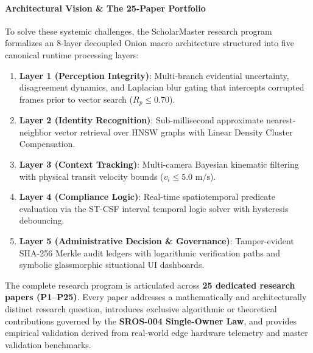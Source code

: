 \documentclass[11pt,letterpaper]{article}
\begin{document}
\paragraph{Architectural Vision \& The 25-Paper Portfolio}
To solve these systemic challenges, the ScholarMaster research program formalizes an 8-layer decoupled Onion macro architecture structured into five canonical runtime processing layers:
\begin{enumerate}[leftmargin=*]
    \item \textbf{Layer 1 (Perception Integrity)}: Multi-branch evidential uncertainty, disagreement dynamics, and Laplacian blur gating that intercepts corrupted frames prior to vector search ($R_p \le 0.70$).
    \item \textbf{Layer 2 (Identity Recognition)}: Sub-millisecond approximate nearest-neighbor vector retrieval over HNSW graphs with Linear Density Cluster Compensation.
    \item \textbf{Layer 3 (Context Tracking)}: Multi-camera Bayesian kinematic filtering with physical transit velocity bounds ($v_i \le 5.0\text{ m/s}$).
    \item \textbf{Layer 4 (Compliance Logic)}: Real-time spatiotemporal predicate evaluation via the ST-CSF interval temporal logic solver with hysteresis debouncing.
    \item \textbf{Layer 5 (Administrative Decision \& Governance)}: Tamper-evident SHA-256 Merkle audit ledgers with logarithmic verification paths and symbolic glassmorphic situational UI dashboards.
\end{enumerate}

The complete research program is articulated across \textbf{25 dedicated research papers (P1--P25)}. Every paper addresses a mathematically and architecturally distinct research question, introduces exclusive algorithmic or theoretical contributions governed by the \textbf{SROS-004 Single-Owner Law}, and provides empirical validation derived from real-world edge hardware telemetry and master validation benchmarks.
\end{document}

